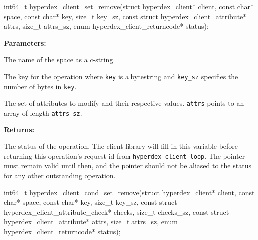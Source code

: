 \funcsep
\begin{ccode}
int64_t hyperdex_client_set_remove(struct hyperdex_client* client,
                const char* space,
                const char* key, size_t key_sz,
                const struct hyperdex_client_attribute* attrs, size_t attrs_sz,
                enum hyperdex_client_returncode* status);
\end{ccode}
\funcdesc 

\noindent\textbf{Parameters:}
\begin{description}[labelindent=\widthof{{\texttt{attrs}, \texttt{attrs\_sz}}},leftmargin=*,noitemsep,nolistsep,align=right]
\item[\texttt{space}] The name of the space as a c-string.
\item[\texttt{key}, \texttt{key\_sz}] The key for the operation where \texttt{key} is a bytestring and \texttt{key\_sz} specifies the number of bytes in \texttt{key}.
\item[\texttt{attrs}, \texttt{attrs\_sz}] The set of attributes to modify and their respective values.  \texttt{attrs} points to an array of length \texttt{attrs\_sz}.
\end{description}

\noindent\textbf{Returns:}
\begin{description}[labelindent=\widthof{{\texttt{status}}},leftmargin=*,noitemsep,nolistsep,align=right]
\item[\texttt{status}] The status of the operation.  The client library will fill in this variable before returning this operation's request id from \texttt{hyperdex\_client\_loop}.  The pointer must remain valid until then, and the pointer should not be aliased to the status for any other outstanding operation.
\end{description}

\funcsep
\begin{ccode}
int64_t hyperdex_client_cond_set_remove(struct hyperdex_client* client,
                const char* space,
                const char* key, size_t key_sz,
                const struct hyperdex_client_attribute_check* checks, size_t checks_sz,
                const struct hyperdex_client_attribute* attrs, size_t attrs_sz,
                enum hyperdex_client_returncode* status);
\end{ccode}
\funcdesc 

